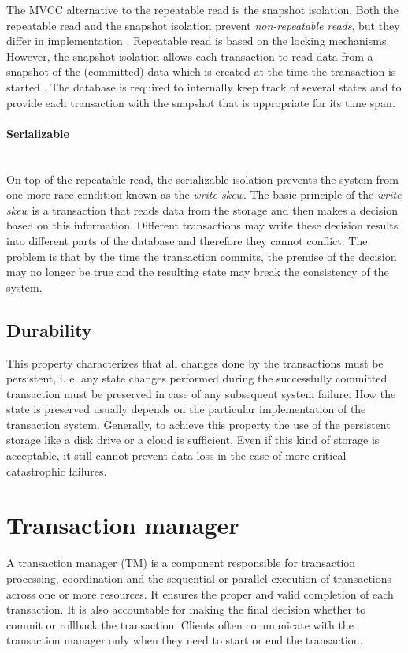 \documentclass[oneside,
  digital, %
  table,   %
  lof,     %
  lot,     %
]{fithesis3}
\newcommand{\newlinepar}[1]{\paragraph{#1}\needspace{4\baselineskip}\mbox{}\\}
\begin{document}
The MVCC alternative to the repeatable read is the snapshot isolation. Both the repeatable read and the snapshot isolation prevent \textit{non-repeatable reads}, but they differ in implementation \cite{isolation_levels}. Repeatable read is based on the locking mechanisms. However, the snapshot isolation allows each transaction to read data from a snapshot of the (committed) data which is created at the time the transaction is started \cite{ansi-sql-critique}. The database is required to internally keep track of several states and to provide each transaction with the snapshot that is appropriate for its time span.

\newlinepar{Serializable}

On top of the repeatable read, the serializable isolation prevents the system from one more race condition known as the \textit{write skew}. The basic principle of the \textit{write skew} is a transaction that reads data from the storage and then makes a decision based on this information. Different transactions may write these decision results into different parts of the database and therefore they cannot conflict. The problem is that by the time the transaction commits, the premise of the decision may no longer be true and the resulting state may break the consistency of the system.

\subsection{Durability}

This property characterizes that all changes done by the transactions must be persistent, i. e. any state changes performed during the successfully committed transaction must be preserved in case of any subsequent system failure. How the state is preserved usually depends on the particular implementation of the transaction system. Generally, to achieve this property the use of the persistent storage like a disk drive or a cloud is sufficient. Even if this kind of storage is acceptable, it still cannot prevent data loss in the case of more critical catastrophic failures.


\section{Transaction manager}
\label{sec:transaction-manager}

A transaction manager (TM) is a component responsible for transaction processing, coordination and the sequential or parallel execution of transactions across one or more resources. It ensures the proper and valid completion of each transaction. It is also accountable for making the final decision whether to commit or rollback the transaction. Clients often communicate with the transaction manager only when they need to start or end the transaction.
\end{document}
